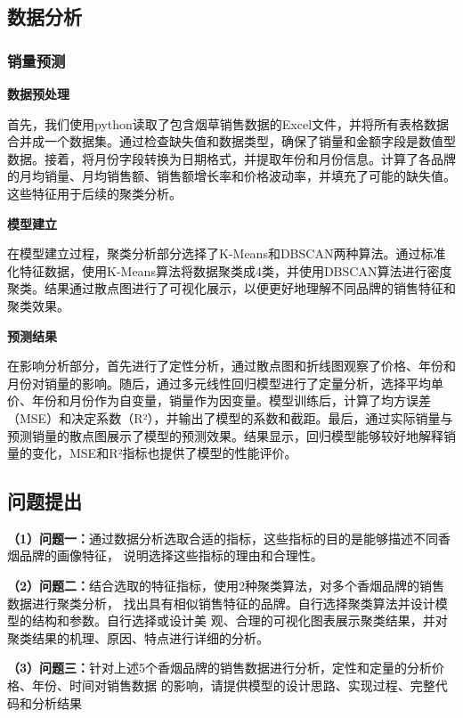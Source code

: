 \documentclass[a4paper]{article}
\begin{document}
\subsection{数据分析}


\subsubsection{销量预测}


\textbf{数据预处理}

首先，我们使用python读取了包含烟草销售数据的Excel文件，并将所有表格数据合并成一个数据集。通过检查缺失值和数据类型，确保了销量和金额字段是数值型数据。接着，将月份字段转换为日期格式，并提取年份和月份信息。计算了各品牌的月均销量、月均销售额、销售额增长率和价格波动率，并填充了可能的缺失值。这些特征用于后续的聚类分析。

\textbf{模型建立}

在模型建立过程，聚类分析部分选择了K-Means和DBSCAN两种算法。通过标准化特征数据，使用K-Means算法将数据聚类成4类，并使用DBSCAN算法进行密度聚类。结果通过散点图进行了可视化展示，以便更好地理解不同品牌的销售特征和聚类效果。

\textbf{预测结果}

在影响分析部分，首先进行了定性分析，通过散点图和折线图观察了价格、年份和月份对销量的影响。随后，通过多元线性回归模型进行了定量分析，选择平均单价、年份和月份作为自变量，销量作为因变量。模型训练后，计算了均方误差（MSE）和决定系数（R²），并输出了模型的系数和截距。最后，通过实际销量与预测销量的散点图展示了模型的预测效果。结果显示，回归模型能够较好地解释销量的变化，MSE和R²指标也提供了模型的性能评价。

\subsection{问题提出}
\textbf{（1）问题一：}通过数据分析选取合适的指标，这些指标的目的是能够描述不同香烟品牌的画像特征，
说明选择这些指标的理由和合理性。
\newline

\textbf{（2）问题二：}结合选取的特征指标，使用2种聚类算法，对多个香烟品牌的销售数据进行聚类分析，
找出具有相似销售特征的品牌。自行选择聚类算法并设计模型的结构和参数。自行选择或设计美
观、合理的可视化图表展示聚类结果，并对聚类结果的机理、原因、特点进行详细的分析。
\newline

\textbf{（3）问题三：}针对上述5个香烟品牌的销售数据进行分析，定性和定量的分析价格、年份、时间对销售数据
的影响，请提供模型的设计思路、实现过程、完整代码和分析结果
\end{document}
